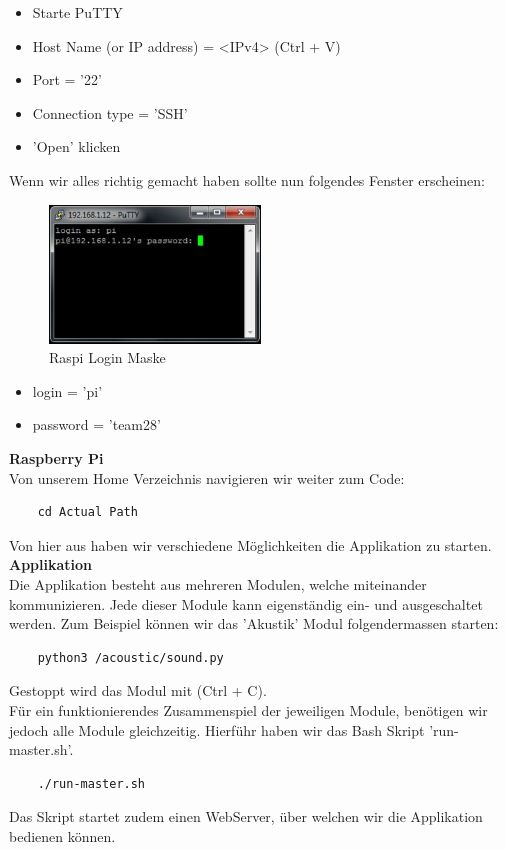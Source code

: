 \documentclass[../../main.tex]{subfiles}
\begin{document}
\begin{itemize}
    \item Starte PuTTY
    \item Host Name (or IP address) = <IPv4> (Ctrl + V)
    \item Port = '22'
    \item Connection type = 'SSH'
    \item 'Open' klicken
\end{itemize}

Wenn wir alles richtig gemacht haben sollte nun folgendes Fenster erscheinen:
\begin{figure}[H] \centering
    \includegraphics[width=0.5\textwidth]{PuttyRaspiLogin}
    \caption{Raspi Login Maske}
    \label{fig:Login}
\end{figure}

\begin{itemize}
    \item login = 'pi'
    \item password = 'team28'
\end{itemize}

\textbf{Raspberry Pi}\\
Von unserem Home Verzeichnis navigieren wir weiter zum Code: \\
\begin{lstlisting}
    cd Actual Path
\end{lstlisting}
Von hier aus haben wir verschiedene Möglichkeiten die Applikation zu starten. \\

\textbf{Applikation}\\
Die Applikation besteht aus mehreren Modulen, welche miteinander kommunizieren. Jede dieser Module kann eigenständig ein- und ausgeschaltet werden. Zum Beispiel können wir das 'Akustik' Modul folgendermassen starten: \\
\begin{lstlisting}
    python3 /acoustic/sound.py
\end{lstlisting}
Gestoppt wird das Modul mit (Ctrl + C).\\
Für ein funktionierendes Zusammenspiel der jeweiligen Module, benötigen wir jedoch alle Module gleichzeitig. Hierführ haben wir das Bash Skript 'run-master.sh'. \\
\begin{lstlisting}
    ./run-master.sh
\end{lstlisting}
Das Skript startet zudem einen WebServer, über welchen wir die Applikation bedienen können. \\
\end{document}
